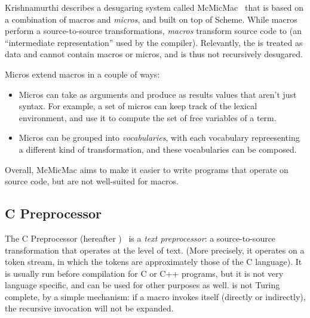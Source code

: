 Krishnamurthi describes a desugaring system called
McMicMac~\cite{sk:mcmicmac} that is based on a combination of macros
and \emph{micros}, and built on top of Scheme. While macros perform a
source-to-source transformations, \emph{macros} transform source code
to  (an ``intermediate representation'' used by the compiler).
Relevantly, the  is treated as data and cannot contain macros
or micros, and is thus not recursively desugared.

Micros extend macros in a couple of ways:
\begin{itemize}
  \item Micros can take as arguments and produce as results values
    that aren't just syntax. For example, a set of micros can keep
    track of the lexical environment, and use it to compute the set of
    free variables of a term.
  \item Micros can be grouped into \emph{vocabularies}, with each
    vocabulary repreesenting a different kind of transformation, and
    these vocabularies can be composed.
\end{itemize}

Overall, McMicMac aims to make it easier to write programs that
operate on source code, but are not well-suited for macros.


\subsection{C Preprocessor} \label{sec:taxonomy-cpre}

The C Preprocessor (hereafter )~\cite{cpp} is a \emph{text
  preprocessor}: a source-to-source transformation that operates at
the level of text. (More precisely, it operates on a token stream, in
which the tokens are approximately those of the C language). It is
usually run before compilation for C or C++ programs, but it is not
very language specific, and can be used for other purposes as well.
 is not Turing complete, by a simple mechanism: if a macro
invokes itself (directly or indirectly), the recursive invocation
will not be expanded.

